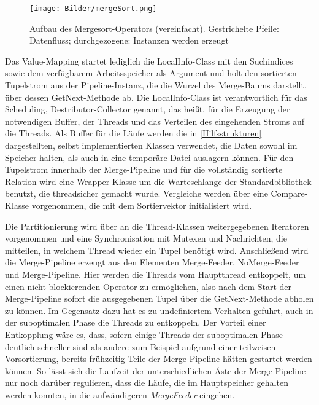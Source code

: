 \documentclass[a4paper,12pt,twoside]{article}
\newcommand{\Fb}[1]{\textit{#1}} %
\begin{document}
\begin{figure}
	\centering
	\texttt{[image: Bilder/mergeSort.png]}
	\caption{Aufbau des Mergesort-Operators (vereinfacht). Gestrichelte Pfeile: Datenfluss; durchgezogene: Instanzen werden erzeugt}
	\label{img:KlassSort}
\end{figure}


Das Value-Mapping startet lediglich die LocalInfo-Class mit den Suchindices sowie dem verfügbarem Arbeitsspeicher als Argument und holt den sortierten Tupelstrom aus der Pipeline-Instanz, die die Wurzel des Merge-Baums darstellt, über dessen GetNext-Methode ab. Die LocalInfo-Class ist verantwortlich für das Scheduling, Destributor-Collector genannt, das heißt, für die Erzeugung der notwendigen Buffer, der Threads und das Verteilen des eingehenden Stroms auf die Threads. Als Buffer für die Läufe werden die in \autoref{Hilfsstrukturen} dargestellten, selbst implementierten Klassen verwendet, die Daten sowohl im Speicher halten, als auch in eine temporäre Datei auslagern können. Für den Tupelstrom innerhalb der Merge-Pipeline und für die vollständig sortierte Relation wird eine Wrapper-Klasse um die Warteschlange der Standardbibliothek benutzt, die threadsicher gemacht wurde. Vergleiche werden über eine Compare-Klasse vorgenommen, die mit dem Sortiervektor initialisiert wird.

Die Partitionierung wird über an die Thread-Klassen weitergegebenen Iteratoren vorgenommen und eine Synchronisation mit Mutexen und Nachrichten, die mitteilen, in welchem Thread wieder ein Tupel benötigt wird. Anschließend wird die Merge-Pipeline erzeugt aus den Elementen Merge-Feeder, NoMerge-Feeder und Merge-Pipeline. Hier werden die Threads vom Hauptthread entkoppelt, um einen nicht-blockierenden Operator zu ermöglichen, also nach dem Start der Merge-Pipeline sofort die ausgegebenen Tupel über die GetNext-Methode abholen zu können. Im Gegensatz dazu hat es zu undefiniertem Verhalten geführt, auch in der suboptimalen Phase die Threads zu entkoppeln. Der Vorteil einer Entkopplung wäre es, dass, sofern einige Threads der suboptimalen Phase deutlich schneller sind als andere zum Beispiel aufgrund einer teilweisen Vorsortierung, bereits frühzeitig Teile der Merge-Pipeline hätten gestartet werden können. So lässt sich die Laufzeit der unterschiedlichen Äste der Merge-Pipeline nur noch darüber regulieren, dass die Läufe, die im Hauptspeicher gehalten werden konnten, in die aufwändigeren \Fb{MergeFeeder} eingehen.
\end{document}
